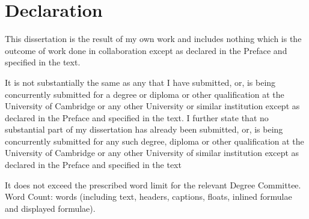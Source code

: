 \chapter*{Declaration}


This dissertation is the result of my own work and includes nothing which is the outcome of work done in collaboration except as declared in the Preface and specified in the text.

It is not substantially the same as any that I have submitted, or, is being concurrently submitted for a degree or diploma or other qualification at the University of Cambridge or any other University or similar institution except as declared in the Preface and specified in the text. I further state that no substantial part of my dissertation has already been submitted, or, is being concurrently submitted for any such degree, diploma or other qualification at the University of Cambridge or any other University of similar institution except as declared in the Preface and specified in the text


It does not exceed the prescribed word limit for the relevant Degree Committee.  
\ifdefined\lightweight{}
\else
Word Count: \wordcount{}words (including text, headers, captions, floats, inlined formulae and displayed formulae).
\fi


\cleardoublepage{}
